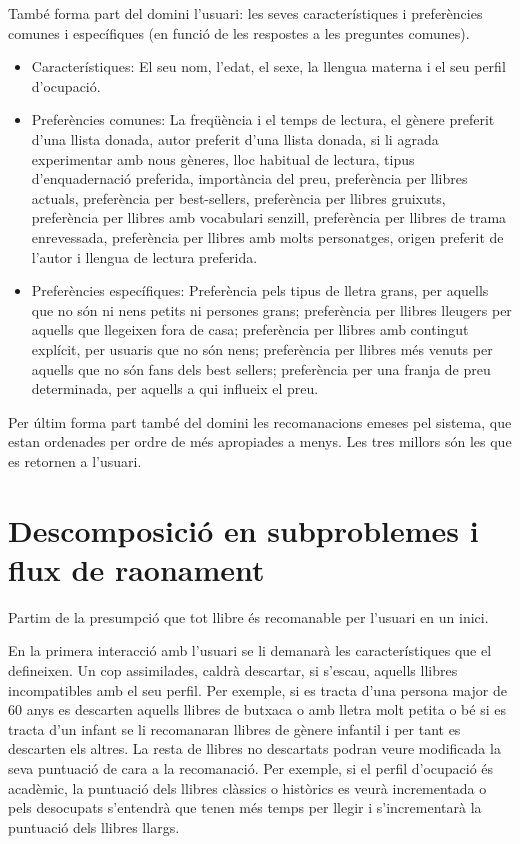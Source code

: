També forma part del domini l'usuari: les seves característiques i preferències comunes i específiques (en funció de les respostes a les preguntes comunes).
\begin{itemize}
  \item Característiques: El seu nom, l'edat, el sexe, la llengua materna i el seu perfil d'ocupació.
  \item Preferències comunes: La freqüència i el temps de lectura, el gènere preferit d'una llista donada, autor preferit d'una llista donada,  si li agrada experimentar amb nous gèneres, lloc habitual de lectura, tipus d'enquadernació preferida, importància del preu, preferència per llibres actuals, preferència per best-sellers, preferència per llibres gruixuts, preferència per llibres amb vocabulari senzill, preferència per llibres de trama enrevessada, preferència per llibres amb molts personatges, origen preferit de l'autor i llengua de lectura preferida.
  \item Preferències específiques: Preferència pels tipus de lletra grans, per aquells que no són ni nens petits ni persones grans; preferència per llibres lleugers per aquells que llegeixen fora de casa; preferència per llibres amb contingut explícit, per usuaris que no són nens; preferència per llibres més venuts per aquells que no són fans dels best sellers; preferència per una franja de preu determinada, per aquells a qui influeix el preu.
\end{itemize}

Per últim forma part també del domini les recomanacions emeses pel sistema, que estan ordenades per ordre de més apropiades a menys. Les tres millors són les que es retornen a l'usuari.

\section{Descomposició en subproblemes i flux de raonament}

Partim de la presumpció que tot llibre és recomanable per l'usuari en un inici. 

En la primera interacció amb l'usuari se li demanarà les característiques que el defineixen. Un cop assimilades, caldrà descartar, si s'escau, aquells llibres incompatibles amb el seu perfil. Per exemple, si es tracta d'una persona major de 60 anys es descarten aquells llibres de butxaca o amb lletra molt petita o bé si es tracta d'un infant se li recomanaran llibres de gènere infantil i per tant es descarten els altres. La resta de llibres no descartats podran veure modificada la seva puntuació de cara a la recomanació. Per exemple, si el perfil d'ocupació és acadèmic, la puntuació dels llibres clàssics o històrics es veurà incrementada o pels desocupats s'entendrà que tenen més temps per llegir i s'incrementarà la puntuació dels llibres llargs. 

